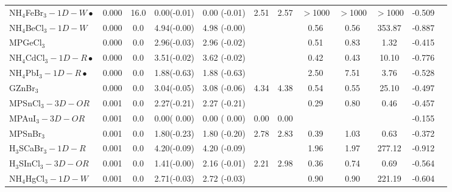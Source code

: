 \begin{table*}
\begin{tabular*}{0.98\textwidth}{@{\extracolsep{\fill}}l c c c c c c c c c c c}
NH$_4$FeBr$_3-1D-W\bullet$&      0.000&       16.0&       0.00(-0.01)&            0.00  (-0.01)&       2.51&            2.57&         $>$1000&         $>$1000&         $>$1000&     -0.509\\
 NH$_4$BeCl$_3-1D-W$&      0.000&        0.0&       4.94(-0.00)&            4.98  (-0.00)&           &                &            0.56&            0.56&          353.87&     -0.887\\
          MPGeCl$_3$&      0.000&        0.0&       2.96(-0.03)&            2.96  (-0.02)&           &                &            0.51&            0.83&            1.32&     -0.415\\
NH$_4$CdCl$_3-1D-R\bullet$&      0.000&        0.0&       3.51(-0.02)&            3.62  (-0.02)&           &                &            0.42&            0.43&           10.10&     -0.776\\
NH$_4$PbI$_3-1D-R\bullet$&      0.000&        0.0&       1.88(-0.63)&            1.88  (-0.63)&           &                &            2.50&            7.51&            3.76&     -0.528\\
           GZnBr$_3$&      0.000&        0.0&       3.04(-0.05)&            3.08  (-0.06)&       4.34&            4.38&            0.54&            0.55&           25.10&     -0.497\\
    MPSnCl$_3-3D-OR$&      0.001&        0.0&       2.27(-0.21)&            2.27  (-0.21)&           &                &            0.29&            0.80&            0.46&     -0.457\\
     MPAuI$_3-3D-OR$&      0.001&        0.0&       0.00( 0.00)&            0.00  ( 0.00)&       0.00&            0.00&                &                &                &     -0.155\\
          MPSnBr$_3$&      0.001&        0.0&       1.80(-0.23)&            1.80  (-0.20)&       2.78&            2.83&            0.39&            1.03&            0.63&     -0.372\\
 H$_3$SCaBr$_3-1D-R$&      0.001&        0.0&       4.20(-0.09)&            4.20  (-0.09)&           &                &            1.96&            1.97&          277.12&     -0.912\\
H$_3$SInCl$_3-3D-OR$&      0.001&        0.0&       1.41(-0.00)&            2.16  (-0.01)&       2.21&            2.98&            0.36&            0.74&            0.69&     -0.564\\
 NH$_4$HgCl$_3-1D-W$&      0.001&        0.0&       2.71(-0.03)&            2.72  (-0.03)&           &                &            0.90&            0.90&          221.19&     -0.604\\

\end{tabular*}
\end{table*}
